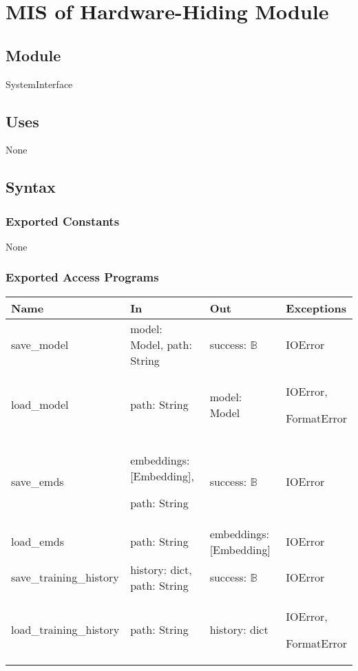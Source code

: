\documentclass[12pt, titlepage]{article}
\begin{document}
\newpage


\section{MIS of Hardware-Hiding Module} \label{ModuleHH}

\subsection{Module}

SystemInterface

\subsection{Uses}
None

\subsection{Syntax}

\subsubsection{Exported Constants}
None
\subsubsection{Exported Access Programs}

\begin{center}
\begin{tabular}{p{4cm} p{4cm} p{4cm} p{2cm}}
\hline
\textbf{Name} & \textbf{In} & \textbf{Out} & \textbf{Exceptions} \\
\hline
save\_model & model: Model, path: String & success: $\mathbb{B}$ & IOError \\
\hline
load\_model & path: String & model: Model & IOError,

FormatError \\
\hline
save\_emds & embeddings: [Embedding],

path: String & success: $\mathbb{B}$ & IOError \\
\hline
load\_emds & path: String & embeddings: [Embedding] & IOError \\
\hline


save\_training\_history & history: dict, path: String & success: $\mathbb{B}$ & IOError \\
\hline
load\_training\_history & path: String & history: dict & IOError, 

FormatError \\
\hline
\end{tabular}
\end{center}
\end{document}
